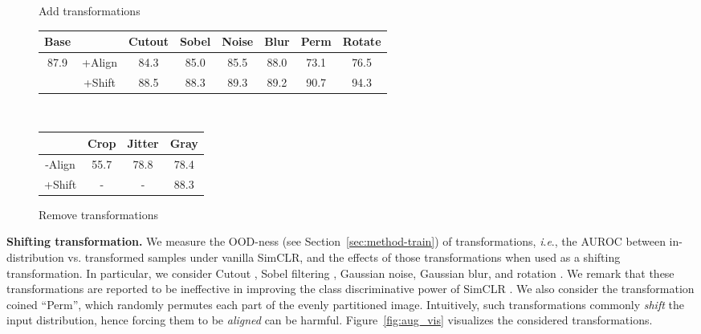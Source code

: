 \documentclass{article}
\newcommand{\ie}{\textit{i}.\textit{e}.}
\begin{document}
\begin{figure*}[t]
{}\label{tab:ablation-aug}
\vspace{-0.05in}
\addtocounter{table}{-1} \begin{subtable}{0.66\textwidth}
\caption{Add transformations}\label{tab:ablation-aug-add}
\begin{tabular}{c|ccccccc}
\toprule
Base && Cutout & Sobel & Noise & Blur & Perm & Rotate \\
\midrule
\multirow{2}{*}{87.9}
& +Align & 84.3 & 85.0 & 85.5 & 88.0 & 73.1 & 76.5 \\
& +Shift & 88.5 & 88.3 & 89.3 & 89.2 & 90.7 & 94.3 \\
\bottomrule
\end{tabular}
\end{subtable}
~\begin{subtable}{0.32\textwidth}
\caption{Remove transformations}\label{tab:ablation-aug-remove}
\begin{tabular}{|cccc}
\toprule
& Crop & Jitter & Gray \\
\midrule
-Align & 55.7 & 78.8 & 78.4 \\
+Shift & - & - & 88.3 \\
\bottomrule
\end{tabular}
\end{subtable}
\vspace{-0.1in}
\end{figure*}

 
\textbf{Shifting transformation.} 
We measure the OOD-ness (see Section~\ref{sec:method-train}) of transformations, \ie, the AUROC between in-distribution vs. transformed samples under vanilla SimCLR, and the effects of those transformations when used as a shifting transformation. In particular, we consider Cutout \citep{devries2017improved}, Sobel filtering \citep{kanopoulos1988design}, Gaussian noise, Gaussian blur, and rotation \citep{gidaris2018unsupervised}. We remark that these transformations are reported to be ineffective in improving the class discriminative power
of SimCLR \citep{chen2020simple}. We also consider the transformation coined ``Perm'', which randomly permutes each part of the evenly partitioned image.
Intuitively, such transformations commonly \textit{shift} the input distribution, hence forcing them to be \textit{aligned} can be harmful. Figure~\ref{fig:aug_vis} visualizes the considered transformations.
\end{document}
